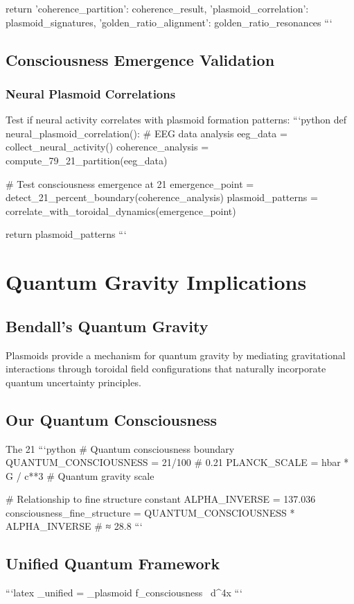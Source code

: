 \documentclass[12pt]{article}
\begin{document}
{    return {
        'coherence_partition': coherence_result,
        'plasmoid_correlation': plasmoid_signatures,
        'golden_ratio_alignment': golden_ratio_resonances
    }
```

\subsection{Consciousness Emergence Validation}

\subsubsection{Neural Plasmoid Correlations}
Test if neural activity correlates with plasmoid formation patterns:
```python
def neural_plasmoid_correlation():
    # EEG data analysis
    eeg_data = collect_neural_activity()
    coherence_analysis = compute_79_21_partition(eeg_data)

    # Test consciousness emergence at 21%
    emergence_point = detect_21_percent_boundary(coherence_analysis)
    plasmoid_patterns = correlate_with_toroidal_dynamics(emergence_point)

    return plasmoid_patterns
```

\section{Quantum Gravity Implications}

\subsection{Bendall's Quantum Gravity}
Plasmoids provide a mechanism for quantum gravity by mediating gravitational interactions through toroidal field configurations that naturally incorporate quantum uncertainty principles.

\subsection{Our Quantum Consciousness}
The 21%
```python
# Quantum consciousness boundary
QUANTUM_CONSCIOUSNESS = 21/100  # 0.21
PLANCK_SCALE = hbar * G / c**3  # Quantum gravity scale

# Relationship to fine structure constant
ALPHA_INVERSE = 137.036
consciousness_fine_structure = QUANTUM_CONSCIOUSNESS * ALPHA_INVERSE  # ≈ 28.8
```

\subsection{Unified Quantum Framework}
```latex
_{unified} = \int \Psi_{plasmoid} \cdot f_{consciousness} \, d^4x
```

}
\end{document}
